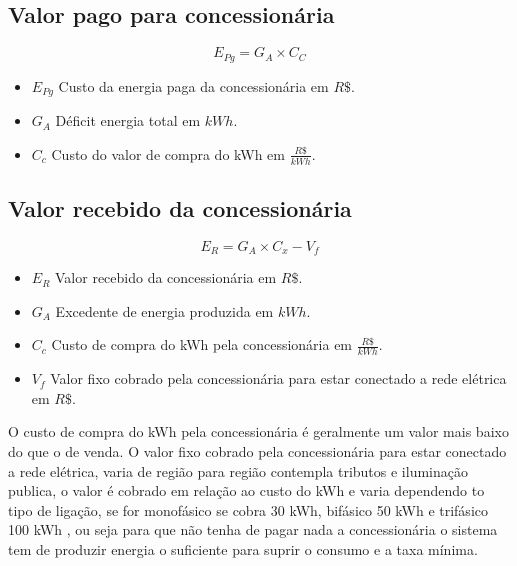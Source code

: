 \subsection{Valor pago para concessionária}

\begin{equation}
    E_{Pg} = G_{A} \times C_{C}
    \label{eq:EV_custo}
\end{equation}

\begin{itemize}
  \item $E_{Pg}$ Custo da energia paga da concessionária em $R\$$.

  \item $G_{A}$ Déficit energia total em $kWh$.

  \item $C_{c}$ Custo do valor de compra do kWh em $\frac{R\$}{kWh}$.
\end{itemize}

\newpage
\subsection{Valor recebido da concessionária}

\begin{equation}
    E_{R} = G_{A} \times C_{x} - V_{f}
    \label{eq:EV_custo}
\end{equation}

\begin{itemize}
  \item $E_{R}$ Valor recebido da concessionária em $R\$$.

  \item $G_{A}$ Excedente de energia produzida em $kWh$.

  \item $C_{c}$ Custo de compra do kWh pela concessionária em $\frac{R\$}{kWh}$.
  
  \item $V_{f}$ Valor fixo cobrado pela concessionária para estar conectado a rede elétrica em $R\$$.
\end{itemize}

O custo de compra do kWh pela concessionária é geralmente um valor mais baixo do que o de venda.
O valor fixo cobrado pela concessionária para estar conectado a rede elétrica, varia de região para região contempla tributos e iluminação publica, o valor é cobrado em relação ao custo do kWh e varia dependendo to tipo de ligação, se for monofásico se cobra 30 kWh, bifásico 50 kWh e trifásico 100 kWh \cite{ANEEL_TARIFA}, ou seja para que não tenha de pagar nada a concessionária o sistema tem de produzir energia o suficiente para suprir o consumo e a taxa mínima.

